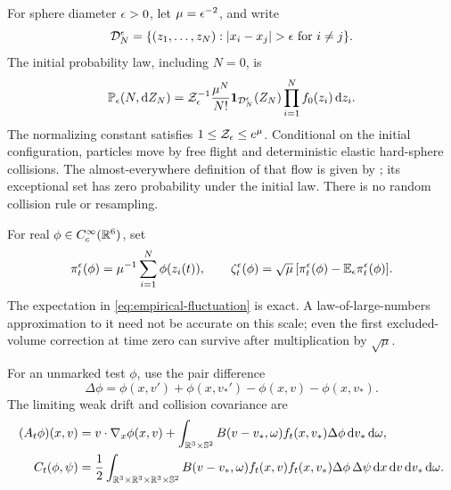For sphere diameter \(\epsilon>0\), let \(\mu=\epsilon^{-2}\), and write
\[
 \mathcal D_N^\eps
 =\{(z_1,\ldots,z_N):|x_i-x_j|>\eps\text{ for }i\ne j\}.
\]
The initial probability law, including \(N=0\), is
\begin{equation}\label{eq:grand-canonical}
 \mathbb P_\epsilon(N,\mathrm d Z_N)
 =\mathcal Z_\epsilon^{-1}\frac{\mu^N}{N!}
   \mathbf 1_{\mathcal D_N^\epsilon}(Z_N)
   \prod_{i=1}^Nf_0(z_i)\,\mathrm d z_i.
\end{equation}
The normalizing constant satisfies \(1\le\mathcal Z_\epsilon\le e^\mu\).
Conditional on the initial configuration, particles move by free flight
and deterministic elastic hard-sphere collisions. The almost-everywhere
definition of that flow is given by \cite[Proposition~1.2]{DHM2025};
its exceptional set has zero probability under the initial law.
There is no random collision rule
or resampling.

For real \(\phi\in C_c^\infty(\mathbb R^6)\), set
\begin{equation}\label{eq:empirical-fluctuation}
 \pi_t^\epsilon(\phi)=\mu^{-1}\sum_{i=1}^N\phi(z_i(t)),
 \qquad
 \zeta_t^\epsilon(\phi)
 =\sqrt\mu\,[\pi_t^\epsilon(\phi)-\mathbb E_\epsilon\pi_t^\epsilon(\phi)].
\end{equation}
The expectation in \eqref{eq:empirical-fluctuation} is exact. A
law-of-large-numbers approximation to it need not be accurate on this
scale; even the first excluded-volume correction at time zero can
survive after multiplication by \(\sqrt\mu\).

For an unmarked test \(\phi\), use the pair difference
\[
 \Delta\phi
 =\phi(x,v')+\phi(x,v_*')-\phi(x,v)-\phi(x,v_*).
\]
The limiting weak drift and collision covariance are
\begin{align}
 (A_t\phi)(x,v)
 &=v\cdot\nabla_x\phi(x,v)
   +\int_{\mathbb R^3\times\mathbb S^2}
      B(v-v_*,\omega)f_t(x,v_*)\Delta\phi
          \,\mathrm d v_*\,\mathrm d\omega,\label{eq:drift}\\
 C_t(\phi,\psi)
 &=\frac12\int_{\mathbb R^3\times\mathbb R^3\times\mathbb R^3\times\mathbb S^2}
       B(v-v_*,\omega)f_t(x,v)f_t(x,v_*)
       \Delta\phi\,\Delta\psi
       \,\mathrm d x\,\mathrm d v\,\mathrm d v_*\,\mathrm d\omega.\label{eq:noise-form}
\end{align}

